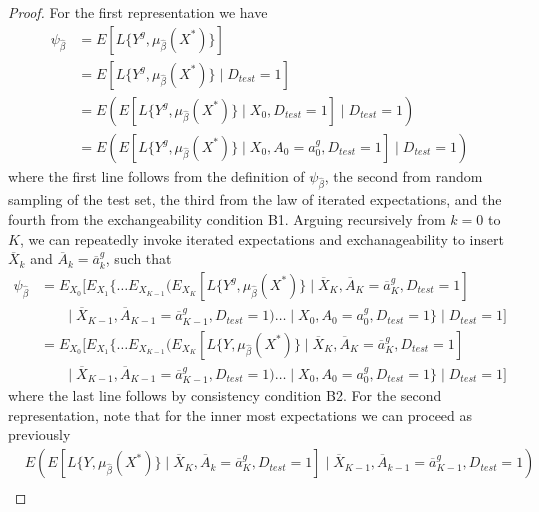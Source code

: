\begin{proof}
    For the first representation we have 
    \begin{align*}
        \psi_{\widehat{\beta}} &= E[L\{Y^{g}, \mu_{\widehat{\beta}}(X^*)\}] \\
        & = E[L\{Y^{g}, \mu_{\widehat{\beta}}(X^*)\}\mid D_{test} = 1] \\
        & = E(E[L\{Y^{g}, \mu_{\widehat{\beta}}(X^*)\}\mid X_0, D_{test} = 1] \mid D_{test} = 1) \\
        & = E(E[L\{Y^{g}, \mu_{\widehat{\beta}}(X^*)\}\mid X_0, A_0 = a^g_0, D_{test} = 1] \mid D_{test} = 1) 
    \end{align*}
    where the first line follows from the definition of $\psi_{\widehat{\beta}}$, the second from random sampling of the test set, the third from the law of iterated expectations, and the fourth from the exchangeability condition B1. Arguing recursively from $k = 0$ to $K$, we can repeatedly invoke iterated expectations and exchanageability to insert $\overline{X}_k$ and $\overline{A}_k = \overline{a}^g_k$, such that
    \begin{align*}
        \psi_{\widehat{\beta}} &= E_{X_0}\bigg[E_{X_1}\bigg\{\ldots E_{X_{K-1}}\bigg(E_{X_{K}}[L\{Y^g, \mu_{\widehat{\beta}}(X^*)\} \mid \overline{X}_K, \overline{A}_K=\overline{a}^g_K, D_{test} = 1] \\
        & \qquad \big\vert\; \overline{X}_{K-1}, \overline{A}_{K-1}=\overline{a}^g_{K-1}, D_{test} = 1\bigg) \ldots \;\big\vert\; X_{0}, A_{0}=a^g_{0}, D_{test} = 1\bigg\}\;\big\vert\; D_{test} = 1\bigg]\\
        &= E_{X_0}\bigg[E_{X_1}\bigg\{\ldots E_{X_{K-1}}\bigg(E_{X_{K}}[L\{Y, \mu_{\widehat{\beta}}(X^*)\} \mid \overline{X}_K, \overline{A}_K=\overline{a}^g_K, D_{test} = 1] \\
        & \qquad \big\vert\; \overline{X}_{K-1}, \overline{A}_{K-1}=\overline{a}^g_{K-1}, D_{test} = 1\bigg) \ldots \;\big\vert\; X_{0}, A_{0}=a^g_{0}, D_{test} = 1\bigg\}\;\big\vert\; D_{test} = 1\bigg]
    \end{align*}
    where the last line follows by consistency condition B2. For the second representation, note that for the inner most expectations we can proceed as previously
    \begin{align*}
        & E(E[L\{Y, \mu_{\widehat{\beta}}(X^*)\} \mid \overline{X}_K, \overline{A}_k=\overline{a}^g_K, D_{test} = 1] \mid \overline{X}_{K-1}, \overline{A}_{k-1}=\overline{a}^g_{K-1}, D_{test} = 1) \\

\end{align*}
\end{proof}
